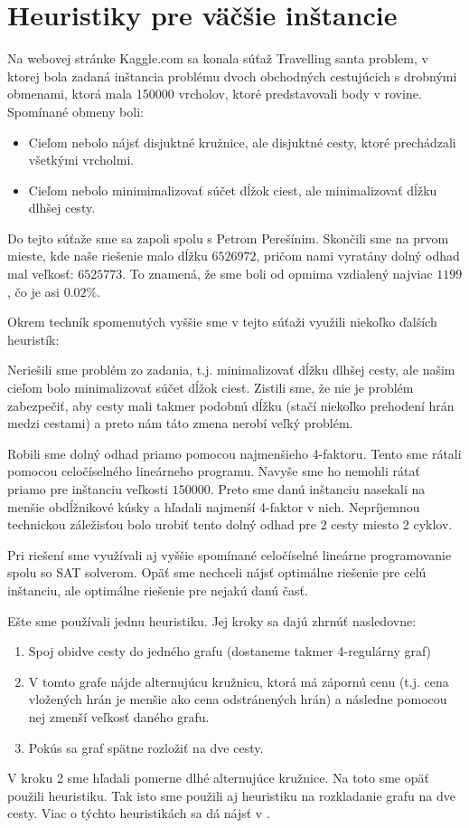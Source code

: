\section{Heuristiky pre väčšie inštancie}

Na webovej stránke Kaggle.com sa konala súťaž Travelling santa problem, v ktorej bola
zadaná inštancia problému dvoch obchodných cestujúcich s drobnými obmenami, ktorá mala
150000 vrcholov, ktoré predstavovali body v rovine. Spomínané obmeny boli:
\begin{itemize}
\item Cieľom nebolo nájsť disjuktné kružnice, ale disjuktné cesty, ktoré prechádzali
všetkými vrcholmi.
\item Cieľom nebolo minimimalizovať súčet dĺžok ciest, ale minimalizovať dĺžku dlhšej
cesty.
\end{itemize}

Do tejto súťaže sme sa zapoli spolu s Petrom Perešínim. Skončili sme na prvom mieste,
kde naše riešenie malo dĺžku $6526972$, pričom nami vyratány dolný odhad
mal veľkosť: $6525773$. To znamená, že sme boli od opmima vzdialený najviac
$1199$, čo je asi $0.02\%$.

Okrem techník spomenutých vyššie sme v tejto súťaži využili niekoľko ďalších heuristík:

Neriešili sme problém zo zadania, t.j. minimalizovať dĺžku dlhšej cesty, ale našim
cieľom bolo minimalizovať súčet dĺžok ciest. Zistili sme, že nie je problém zabezpečiť,
aby cesty mali takmer podobnú dĺžku (stačí niekoľko prehodení hrán medzi cestami) a preto
nám táto zmena nerobí veľký problém.

Robili sme dolný odhad priamo pomocou najmenšieho 4-faktoru. Tento sme rátali
pomocou celočíselného lineárneho programu. Navyše sme ho nemohli rátať priamo
pre inštanciu veľkosti $150000$. Preto sme danú inštanciu nasekali na menšie
obdĺžnikové kúsky a hľadali najmenší 4-faktor v nich. Nepríjemnou technickou
záležisťou bolo urobiť tento dolný odhad pre 2 cesty miesto 2 cyklov.

Pri riešení sme využívali aj vyššie spomínané celočíselné lineárne programovanie
spolu so SAT solverom. Opäť sme nechceli nájsť optimálne riešenie pre celú inštanciu,
ale optimálne riešenie pre nejakú danú časť.

Ešte sme používali jednu heuristiku. Jej kroky sa dajú zhrnúť nasledovne:
\begin{enumerate}
\item Spoj obidve cesty do jedného grafu (dostaneme takmer 4-regulárny graf)
\item V tomto grafe nájde alternujúcu kružnicu, ktorá má zápornú cenu (t.j. cena vložených
hrán je menšie ako cena odstránených hrán) a následne pomocou nej zmenší veľkosť
daného grafu.
\item Pokús sa graf spätne rozložiť na dve cesty.
\end{enumerate}

V kroku 2 sme hľadali pomerne dlhé alternujúce kružnice. Na toto sme opäť
použili heuristiku. Tak isto sme použili aj heuristiku na rozkladanie grafu
na dve cesty. Viac o týchto heuristikách sa dá nájsť v \cite{KAGGLE}. 
